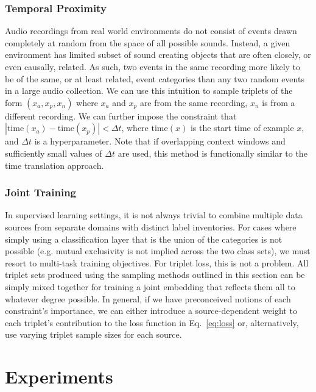 \documentclass{article}
\begin{document}
\subsubsection{Temporal Proximity}
Audio recordings from real world environments do not consist of events drawn
completely at random from the space of all possible sounds.  Instead, a given
environment has limited subset of sound creating objects that are often closely,
or even causally, related.  As such, two events in the same recording more
likely to be of the same, or at least related, event categories than any two
random events in a large audio collection.  We can use this intuition to sample
triplets of the form $(x_a,x_p,x_n)$ where $x_a$ and $x_p$ are from the same
recording, $x_n$ is from a different recording. We can further impose the
constraint that $|\mathrm{time}(x_a)-\mathrm{time}(x_p)| < \Delta t$, where
$\mathrm{time}(x)$ is the start time of example $x$, and $\Delta t$ is a
hyperparameter.  Note that if overlapping context windows and sufficiently small
values of $\Delta t$ are used, this method is functionally similar to the time
translation approach.

\subsubsection{Joint Training}
In supervised learning settings, it is not always trivial to combine multiple
data sources from separate domains with distinct label inventories.  For cases
where simply using a classification layer that is the union of the categories is
not possible (e.g. mutual exclusivity is not implied across the two class sets),
we must resort to multi-task training objectives.  For triplet loss, this is not
a problem.  All triplet sets produced using the sampling methods outlined in
this section can be simply mixed together for training a joint embedding that
reflects them all to whatever degree possible.  In general, if we have
preconceived notions of each constraint's importance, we can either introduce a
source-dependent weight to each triplet's contribution to the loss function in
Eq.~\ref{eq:loss} or, alternatively, use varying triplet sample sizes for each
source.

\section{Experiments}
\label{sec:exp}
\end{document}
